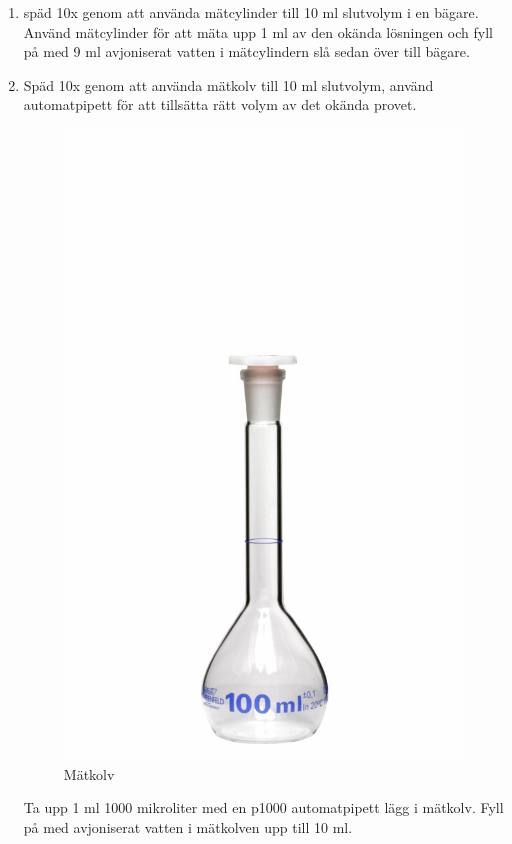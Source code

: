 \documentclass[./chem_exercises.tex]{subfiles}
\begin{document}
\begin{enumerate}
\item späd 10x genom att använda mätcylinder till 10 ml slutvolym i en bägare.
Använd mätcylinder för att mäta upp 1 ml av den okända lösningen och fyll på med
9 ml avjoniserat vatten i mätcylindern slå sedan över till bägare.

\item Späd 10x genom att använda mätkolv till 10 ml slutvolym, använd automatpipett för att
tillsätta rätt volym av det okända provet.
\begin{figure}[H]
\begin{center}
  \includegraphics[scale=0.1]{mätkolv.jpg}
  \caption{Mätkolv}
  \end{center}
  \label{fig4}
\end{figure}
Ta upp 1 ml 1000 mikroliter med en p1000 automatpipett lägg i mätkolv. Fyll på med
avjoniserat vatten i mätkolven upp till 10 ml.


\end{enumerate}
\end{document}
